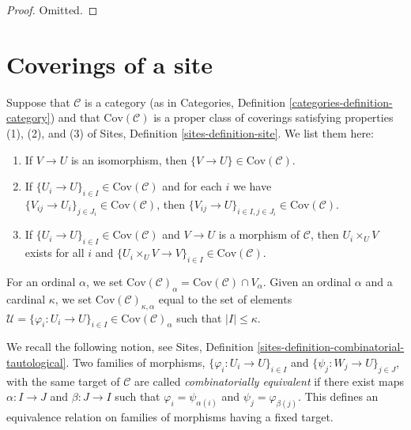 \begin{proof}
Omitted.
\end{proof}

\section{Coverings of a site}
\label{section-coverings-site}

\noindent
Suppose that $\mathcal{C}$ is a category (as in
Categories, Definition \ref{categories-definition-category}) and
that $\text{Cov}(\mathcal{C})$ is a proper class of coverings
satisfying properties (1), (2), and (3) of Sites,
Definition \ref{sites-definition-site}. We list them here:
\begin{enumerate}
\item If $V \to U$ is an isomorphism, then $\{V \to U\} \in
\text{Cov}(\mathcal{C})$.
\item If $\{U_i \to U\}_{i\in I} \in \text{Cov}(\mathcal{C})$ and for each
$i$ we have $\{V_{ij} \to U_i\}_{j\in J_i} \in \text{Cov}(\mathcal{C})$, then
$\{V_{ij} \to U\}_{i \in I, j\in J_i} \in \text{Cov}(\mathcal{C})$.
\item If $\{U_i \to U\}_{i\in I}\in \text{Cov}(\mathcal{C})$
and $V \to U$ is a morphism of $\mathcal{C}$, then $U_i \times_U V$
exists for all $i$ and
$\{U_i \times_U V \to V \}_{i\in I} \in \text{Cov}(\mathcal{C})$.
\end{enumerate}
For an ordinal $\alpha$, we set
$\text{Cov}(\mathcal{C})_\alpha = \text{Cov}(\mathcal{C}) \cap V_\alpha$.
Given an ordinal $\alpha$ and a cardinal $\kappa$, we set
$\text{Cov}(\mathcal{C})_{\kappa, \alpha}$ equal to the set
of elements
$\mathcal{U} =
\{\varphi_i : U_i \to U\}_{i\in I} \in \text{Cov}(\mathcal{C})_\alpha$
such that $|I| \leq \kappa$.

\medskip\noindent
We recall the following notion, see Sites, Definition
\ref{sites-definition-combinatorial-tautological}.
Two families of morphisms, $\{\varphi_i : U_i \to U\}_{i\in I}$ and
$\{\psi_j : W_j \to U\}_{j\in J}$, with the same target of $\mathcal{C}$ are
called {\it combinatorially equivalent} if there exist maps
$\alpha : I \to J$ and $\beta : J\to I$ such that
$\varphi_i = \psi_{\alpha(i)}$ and $\psi_j = \varphi_{\beta(j)}$.
This defines an equivalence relation on families of morphisms
having a fixed target.

